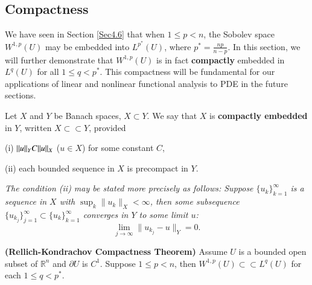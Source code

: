\subsection{Compactness}
We have seen in Section \ref{Sec4.6} that when $1\le p<n$, the Sobolev space $W^{1,p}(U)$ may be embedded into $L^{p^*}(U)$, where $p^*=\frac{np}{n-p}$. In this section, we will further demonstrate that $W^{1,p}(U)$ is in fact \textbf{compactly} embedded in $L^q(U)$ for all $1\le q<p^*$. This compactness will be fundamental for our applications of linear and nonlinear functional analysis to PDE in the future sections.
\begin{definition}
Let $X$ and $Y$ be Banach spaces, $X\subset Y$. We say that $X$ is \textbf{compactly embedded} in $Y$, written $X\subset\subset Y$, provided \par
(i) $\|u\|_Y\large C\|u\|_X$ ($u\in X$) for some constant $C$,\par
(ii) each bounded sequence in $X$ is precompact in $Y$.
\end{definition}
\begin{note}\em
The condition (ii) may be stated more precisely as follows: Suppose $\{u_k\}_{k=1}^\infty$ is a sequence in $X$ with $\sup_k\|u_k\|_X<\infty$, then some subsequence $\{u_{k_j}\}_{j=1}^\infty\subset\{u_k\}_{k=1}^\infty$ converges in $Y$ to some limit $u$: 
$$\lim_{j\to\infty}\|u_{k_j}-u\|_Y=0.$$
\end{note}
\begin{theorem}{\textbf{(Rellich-Kondrachov Compactness Theorem)}}
Assume $U$ is a bounded open subset of $\mathbb{R}^n$ and $\partial U$ is $C^1$. Suppose $1\le p<n$, then $W^{1,p}(U)\subset\subset L^q(U)$ for each $1\le q<p^*$.
\end{theorem}
